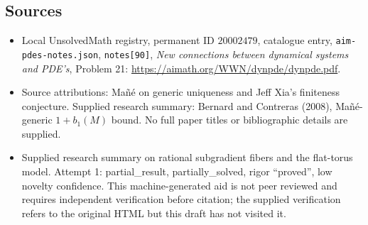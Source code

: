 \documentclass[11pt]{article}
\begin{document}
\subsection{Sources}
\begin{itemize}
\item Local UnsolvedMath registry, permanent ID \(20002479\), catalogue entry, \texttt{aim-pdes-notes.json}, \texttt{notes[90]}, \emph{New connections between dynamical systems and PDE's}, Problem 21: \url{https://aimath.org/WWN/dynpde/dynpde.pdf}.
\item Source attributions: Ma\~n\'e on generic uniqueness and Jeff Xia's finiteness conjecture. Supplied research summary: Bernard and Contreras (2008), Ma\~n\'e-generic \(1+b_1(M)\) bound. No full paper titles or bibliographic details are supplied.
\item Supplied research summary on rational subgradient fibers and the flat-torus model. Attempt 1: partial\_result, partially\_solved, rigor ``proved'', low novelty confidence. This machine-generated aid is not peer reviewed and requires independent verification before citation; the supplied verification refers to the original HTML but this draft has not visited it.
\end{itemize}
\end{document}
